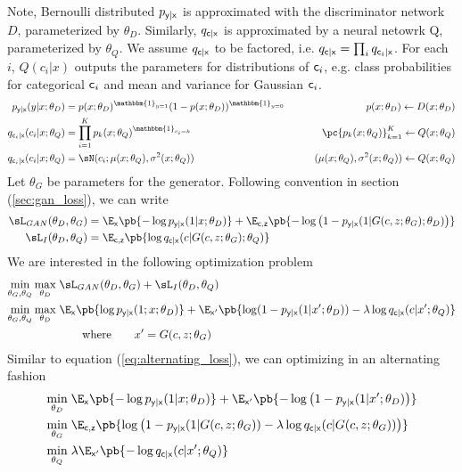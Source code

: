 \documentclass[11pt]{article}
\begin{document}
Note, Bernoulli distributed $p_{\mathsf{y}|\mathsf{x}}$ is approximated with the discriminator network $D$, parameterized by $\theta_D$. Similarly, $q_{\mathsf{c}|\mathsf{x}}$ is approximated by a neural netowrk Q, parameterized by $\theta_Q$. We assume $q_{\mathsf{c}|\mathsf{x}}$ to be factored, i.e. $q_{\mathsf{c}|\mathsf{x}} = \prod_i q_{\mathsf{c}_i|\mathsf{x}}$. For each $i$, $Q(c_i|x)$ outputs the parameters for distributions of $\mathsf{c}_i$, e.g. class probabilities for categorical $\mathsf{c}_i$ and mean and variance for Gaussian $\mathsf{c}_i$.
\begin{align*}
    p_{\ry|\rx}(y|x;\theta_D) 
        &= p(x;\theta_D)^{\mathbbm{1}_{y=1}} ( 1-p(x;\theta_D) )^{\mathbbm{1}_{y=0}}
        &\quad\quad p(x;\theta_D) \leftarrow D(x;\theta_D) \\
    q_{\rc_i|\rx}(c_i|x;\theta_Q) 
        &= \prod_{i=1}^K p_k(x;\theta_Q)^{\mathbbm{1}_{c_i=k}}
        &\quad\quad \pc{p_k(x;\theta_Q)}_{k=1}^K \leftarrow Q(x;\theta_Q) \\
    q_{\rc_i|\rx}(c_i|x;\theta_Q) 
        &= \sN(c_i; \mu(x;\theta_Q), \sigma^2(x;\theta_Q))
        &\quad\quad (\mu(x;\theta_Q), \sigma^2(x;\theta_Q)) \leftarrow Q(x;\theta_Q)
\end{align*}
Let $\theta_G$ be parameters for the generator. Following convention in section (\ref{sec:gan_loss}), we can write
\begin{align*}
    \sL_{GAN}(\theta_D,\theta_G) 
        &= \E_{\rx}\pb{ -\log p_{\ry|\rx}(1|x;\theta_D) } +  \E_{\rc,\rz}\pb{ -\log \left( 1- p_{\ry|\rx}(1|G(c,z;\theta_G);\theta_D) \right) }    \\
    \sL_{I}(\theta_D,\theta_Q)
        &= \E_{\rc,\rz}\pb{ \log q_{\rc|\rx}(c|G(c,z;\theta_G);\theta_Q) } 
\end{align*}
We are interested in the following optimization problem
\begin{align*}
    \min_{\theta_G,\theta_Q} \max_{\theta_D} \;
        &\sL_{GAN}(\theta_D,\theta_G) + \sL_{I}(\theta_D,\theta_Q) \\
    \min_{\theta_G,\theta_Q} \max_{\theta_D} \;
        &\E_{\rx}\pb{\log p_{\ry|\rx}(1;x;\theta_D)} + \E_{\rx'} \pb{ \log (1-p_{\ry|\rx}(1|x';\theta_D))- \lambda \log q_{\rc|\rx}(c|x';\theta_Q) }\\
        &\quad\quad\text{where}\quad\quad x' = G(c,z;\theta_G)
\end{align*}
Similar to equation (\ref{eq:alternating_loss}), we can optimizing in an alternating fashion
\begin{align*}
    \min_{\theta_D} \;
        &\E_{\rx}\pb{ -\log p_{\ry|\rx}(1|x;\theta_D) } + \E_{\rx'}\pb{ -\log \left( 1- p_{\ry|\rx}(1|x';\theta_D) \right) }  \\
    \min_{\theta_G} \;
        &\E_{\rc,\rz}\pb{ \log \left( 1- p_{\ry|\rx}(1|G(c,z;\theta_G)) - \lambda \log q_{\rc|\rx}(c|G(c,z;\theta_G))  \right)  } \\
    \min_{\theta_Q} \;
        &\lambda \E_{\rx'}\pb{ -\log q_{\rc|\rx}(c|x';\theta_Q) }
\end{align*}
\end{document}
